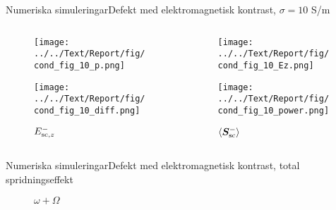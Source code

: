 \documentclass[11pt]{beamer}
\begin{document}
	\begin{frame}{Numeriska simuleringar}{Defekt med elektromagnetisk kontrast, $\sigma = 10$ S/m}
		\begin{columns}
			\begin{column}{0.5\textwidth}
				\begin{figure}
					\centering
					\begin{overprint}
						\texttt{[image: ../../Text/Report/fig/cond\_fig\_10\_p.png]}
						\caption*{$p$}
						
						\texttt{[image: ../../Text/Report/fig/cond\_fig\_10\_diff.png]}
						\caption*{$E_{\mathrm{sc}, z}^-$}
					\end{overprint}
				\end{figure}
			\end{column}
			\begin{column}{0.5\textwidth}
				\begin{figure}
					\centering
					\begin{overprint}
						\onslide<1>
						\texttt{[image: ../../Text/Report/fig/cond\_fig\_10\_Ez.png]}
						\caption*{$E_{\mrm{i}, z}$}
						
						\onslide<2>
						\texttt{[image: ../../Text/Report/fig/cond\_fig\_10\_power.png]}
						\caption*{$\left< \bm{S}_{\mathrm{sc}}^- \right>$}
					\end{overprint}
				\end{figure}
			\end{column}
		\end{columns}
	\end{frame}
	
	\begin{frame}{Numeriska simuleringar}{Defekt med elektromagnetisk kontrast, total spridningseffekt}
		\begin{figure}
			\centering
			\resizebox{!}{0.8\textheight}{}
			\caption*{$\omega + \Omega$}
		\end{figure}
	\end{frame}
	
\end{document}
